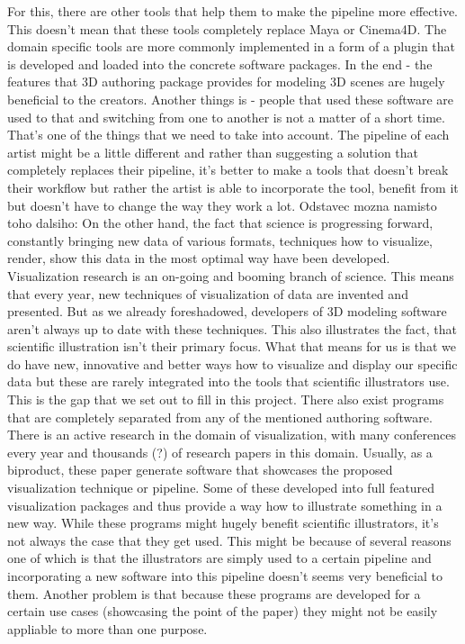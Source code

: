 \documentclass[
  digital, %
  table,   %
  lof,     %
  lot,     %
]{fithesis3}
\begin{document}
For this, there are other tools that help them to make the pipeline more effective. This doesn't mean that these tools completely replace Maya or Cinema4D. The domain specific tools are more commonly implemented in a form of a plugin that is developed and loaded into the concrete software packages.
In the end - the features that 3D authoring package provides for modeling 3D scenes are hugely beneficial to the creators. Another things is - people that used these software are used to that and switching from one to another is not a matter of a short time. That's one of the things that we need to take into account. The pipeline of each artist might be a little different and rather than suggesting a solution that completely replaces their pipeline, it's better to make a tools that doesn't break their workflow but rather the artist is able to incorporate the tool, benefit from it but doesn't have to change the way they work a lot.
Odstavec mozna namisto toho dalsiho: On the other hand, the fact that science is progressing forward, constantly bringing new data of various formats, techniques how to visualize, render, show this data in the most optimal way have been developed. Visualization research is an on-going and booming branch of science. This means that every year, new techniques of visualization of data are invented and presented. But as we already foreshadowed, developers of 3D modeling software aren't always up to date with these techniques. This also illustrates the fact, that scientific illustration isn't their primary focus. What that means for us is that we do have new, innovative and better ways how to visualize and display our specific data but these are rarely integrated into the tools that scientific illustrators use. This is the gap that we set out to fill in this project.
There also exist programs that are completely separated from any of the mentioned authoring software. There is an active research in the domain of visualization, with many conferences every year and thousands (?) of research papers in this domain. Usually, as a biproduct, these paper generate software that showcases the proposed visualization technique or pipeline. Some of these developed into full featured visualization packages and thus provide a way how to illustrate something in a new way. While these programs might hugely benefit scientific illustrators, it's not always the case that they get used. This might be because of several reasons one of which is that the illustrators are simply used to a certain pipeline and incorporating a new software into this pipeline doesn't seems very beneficial to them. Another problem is that because these programs are developed for a certain use cases (showcasing the point of the paper) they might not be easily appliable to more than one purpose.
\end{document}
